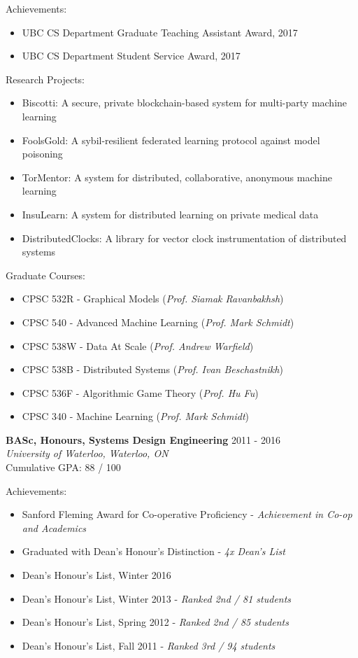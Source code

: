 \documentclass[10pt]{res} %
\begin{document}
Achievements:
\begin{itemize} 
    \item UBC CS Department Graduate Teaching Assistant Award, 2017
    \item UBC CS Department Student Service Award, 2017
\end{itemize}

Research Projects:
\begin{itemize}   
    \item Biscotti: A secure, private blockchain-based system for multi-party machine learning
    \item FoolsGold: A sybil-resilient federated learning protocol against 
    model poisoning 
    \item TorMentor: A system for distributed, collaborative, anonymous
    machine learning
    \item InsuLearn: A system for distributed learning on private
    medical data
    \item DistributedClocks: A library for vector clock instrumentation
    of distributed systems
\end{itemize}

Graduate Courses:
\begin{itemize} 
    \item CPSC 532R - Graphical Models (\emph{Prof. Siamak Ravanbakhsh})
    \item CPSC 540 - Advanced Machine Learning (\emph{Prof. Mark
    Schmidt})
    \item CPSC 538W - Data At Scale (\emph{Prof. Andrew Warfield})
    \item CPSC 538B - Distributed Systems (\emph{Prof. Ivan
    Beschastnikh})
    \item CPSC 536F - Algorithmic Game Theory (\emph{Prof. Hu Fu})
    \item CPSC 340 - Machine Learning (\emph{Prof. Mark Schmidt})
\end{itemize}

\textbf {BASc, Honours, Systems Design Engineering} \hfill 2011 - 2016 \\ 
{\sl University of Waterloo, Waterloo, ON} \\
Cumulative GPA: 88 / 100

Achievements:
\begin{itemize} 
    \item Sanford Fleming Award for Co-operative Proficiency - {\sl
    Achievement in Co-op and Academics}
    \item Graduated with Dean's Honour's Distinction - {\sl 4x Dean's List}
    \item Dean's Honour's List, Winter 2016
    \item Dean's Honour's List, Winter 2013 - {\sl Ranked 2nd / 81 students}
    \item Dean's Honour's List, Spring 2012 - {\sl Ranked 2nd / 85 students}
    \item Dean's Honour's List, Fall 2011 - {\sl Ranked 3rd / 94 students}
\end{itemize}
\end{document}

